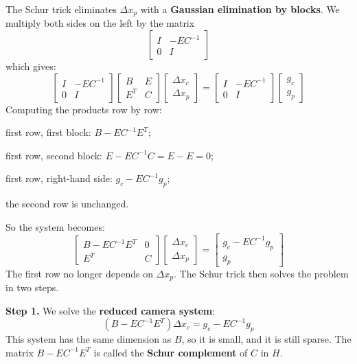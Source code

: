The Schur trick eliminates $\Delta x_p$ with a \textbf{Gaussian elimination by blocks}. We multiply both sides on the left by the matrix
\[
\begin{bmatrix} I & -E C^{-1} \\ 0 & I \end{bmatrix}
\]
which gives:
\[
\begin{bmatrix} I & -E C^{-1} \\ 0 & I \end{bmatrix}
\begin{bmatrix} B & E \\ E^T & C \end{bmatrix}
\begin{bmatrix} \Delta x_c \\ \Delta x_p \end{bmatrix}
=
\begin{bmatrix} I & -E C^{-1} \\ 0 & I \end{bmatrix}
\begin{bmatrix} g_c \\ g_p \end{bmatrix}
\]
Computing the products row by row:
\begin{compactitemize}
    \item first row, first block: $B - E C^{-1} E^T$;
    \item first row, second block: $E - E C^{-1} C = E - E = 0$;
    \item first row, right-hand side: $g_c - E C^{-1} g_p$;
    \item the second row is unchanged.
\end{compactitemize}
So the system becomes:
\[
\begin{bmatrix} B - E C^{-1} E^T & 0 \\ E^T & C \end{bmatrix}
\begin{bmatrix} \Delta x_c \\ \Delta x_p \end{bmatrix}
=
\begin{bmatrix} g_c - E C^{-1} g_p \\ g_p \end{bmatrix}
\]
The first row no longer depends on $\Delta x_p$. The Schur trick then solves the problem in two steps.

\textbf{Step 1.} We solve the \textbf{reduced camera system}:
\[
\left(B - E C^{-1} E^T\right) \Delta x_c = g_c - E C^{-1} g_p
\]
This system has the same dimension as $B$, so it is small, and it is still sparse. The matrix $B - E C^{-1} E^T$ is called the \textbf{Schur complement} of $C$ in $H$.

